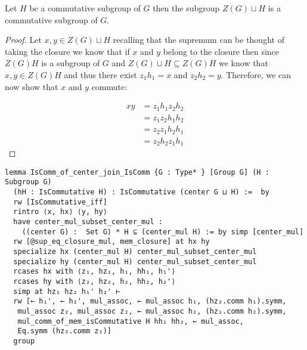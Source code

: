 \begin{lemma}
  \label{IsComm_of_center_join_IsComm}
  \leanok
  Let $H$ be a commutative subgroup of $G$ then the subgroup $Z(G) \sqcup H$  is a commutative subgroup of $G$.
\end{lemma}
\begin{proof}
  \leanok
  Let $x, y \in Z(G) \sqcup H$ recalling that the supremum can be thought of taking the closure
  we know that if $x$ and $y$ belong to the closure then since $Z(G) H$ is a subgroup of $G$ and $Z(G) \sqcup H \subseteq Z(G) H$
  we know that $x, y \in Z(G) H$ and thus there exist $z_1 h_1 = x$ and $z_2 h_2 = y$. Therefore, we can now show that $x$ and $y$ commute:

  \begin{align*}
  x y &= z_1 h_1 z_2 h_2\\
  & = z_1 z_2 h_1 h_2 \tag{as $z_2$ is in the center}\\
  &= z_2 z_1 h_2 h_1 \tag{as $H$ is a commutative subgroup}\\
  &= z_2 h_2 z_1 h_1 \tag{as $z_1$ is in the center}
  \end{align*}
\end{proof}
\begin{footnotesize}
\begin{verbatim}
lemma IsComm_of_center_join_IsComm {G : Type* } [Group G] (H : Subgroup G)
  (hH : IsCommutative H) : IsCommutative (center G ⊔ H) :=  by
  rw [IsCommutative_iff]
  rintro ⟨x, hx⟩ ⟨y, hy⟩
  have center_mul_subset_center_mul :
    ((center G) :  Set G) * H ⊆ (center_mul H) := by simp [center_mul]
  rw [@sup_eq_closure_mul, mem_closure] at hx hy
  specialize hx (center_mul H) center_mul_subset_center_mul
  specialize hy (center_mul H) center_mul_subset_center_mul
  rcases hx with ⟨z₁, hz₁, h₁, hh₁, h₁'⟩
  rcases hy with ⟨z₂, hz₂, h₂, hh₂, h₂'⟩
  simp at hz₁ hz₂ h₁' h₂' ⊢
  rw [← h₁', ← h₂', mul_assoc, ← mul_assoc h₁, (hz₂.comm h₁).symm,
   mul_assoc z₂, mul_assoc z₂, ← mul_assoc h₂, (hz₁.comm h₂).symm,
   mul_comm_of_mem_isCommutative H hh₁ hh₂, ← mul_assoc,
   Eq.symm (hz₂.comm z₁)]
  group
\end{verbatim}
\end{footnotesize}

